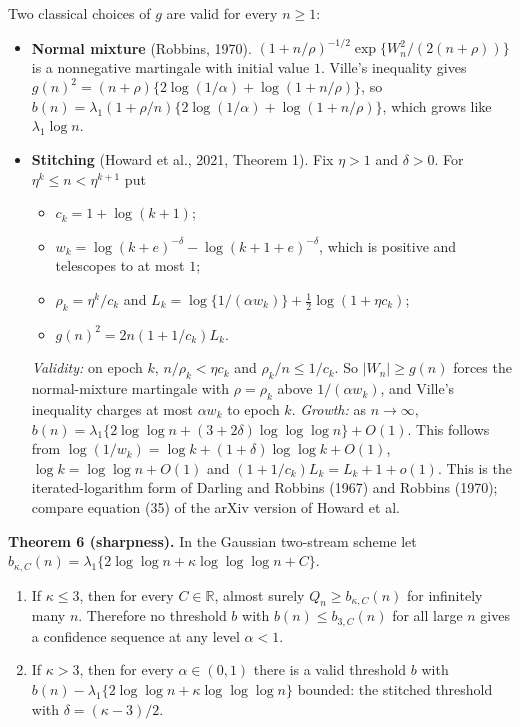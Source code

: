 \documentclass[
  10pt,
  a4paper,
]{article}
\providecommand{\tightlist}{%
  \setlength{\itemsep}{0pt}\setlength{\parskip}{0pt}}
\begin{document}
Two classical choices of \(g\) are valid for every \(n\ge1\):

\begin{itemize}
\tightlist
\item
  \textbf{Normal mixture} (Robbins, 1970).
  \((1+n/\rho)^{-1/2}\exp\{W_n^2/(2(n+\rho))\}\) is a nonnegative
  martingale with initial value \(1\). Ville's inequality gives
  \(g(n)^2=(n+\rho)\{2\log(1/\alpha)+\log(1+n/\rho)\}\), so
  \(b(n)=\lambda_1(1+\rho/n)\{2\log(1/\alpha)+\log(1+n/\rho)\}\), which
  grows like \(\lambda_1\log n\).
\item
  \textbf{Stitching} (Howard et al., 2021, Theorem 1). Fix \(\eta>1\)
  and \(\delta>0\). For \(\eta^k\le n<\eta^{k+1}\) put

  \begin{itemize}
  \tightlist
  \item
    \(c_k=1+\log(k+1)\);
  \item
    \(w_k=\log(k+e)^{-\delta}-\log(k+1+e)^{-\delta}\), which is positive
    and telescopes to at most \(1\);
  \item
    \(\rho_k=\eta^k/c_k\) and
    \(L_k=\log\{1/(\alpha w_k)\}+\tfrac12\log(1+\eta c_k)\);
  \item
    \(g(n)^2=2n(1+1/c_k)L_k\).
  \end{itemize}

  \emph{Validity:} on epoch \(k\), \(n/\rho_k<\eta c_k\) and
  \(\rho_k/n\le1/c_k\). So \(|W_n|\ge g(n)\) forces the normal-mixture
  martingale with \(\rho=\rho_k\) above \(1/(\alpha w_k)\), and Ville's
  inequality charges at most \(\alpha w_k\) to epoch \(k\).
  \emph{Growth:} as \(n\to\infty\),
  \(b(n)=\lambda_1\{2\log\log n+(3+2\delta)\log\log\log n\}+O(1)\). This
  follows from \(\log(1/w_k)=\log k+(1+\delta)\log\log k+O(1)\),
  \(\log k=\log\log n+O(1)\) and \((1+1/c_k)L_k=L_k+1+o(1)\). This is
  the iterated-logarithm form of Darling and Robbins (1967) and Robbins
  (1970); compare equation (35) of the arXiv version of Howard et al.
\end{itemize}

\textbf{Theorem 6 (sharpness).} In the Gaussian two-stream scheme let
\(b_{\kappa,C}(n)=\lambda_1\{2\log\log n+\kappa\log\log\log n+C\}\).

\begin{enumerate}
\def\labelenumi{(\roman{enumi})}
\item
  If \(\kappa\le3\), then for every \(C\in\mathbb R\), almost surely
  \(Q_n\ge b_{\kappa,C}(n)\) for infinitely many \(n\). Therefore no
  threshold \(b\) with \(b(n)\le b_{3,C}(n)\) for all large \(n\) gives
  a confidence sequence at any level \(\alpha<1\).
\item
  If \(\kappa>3\), then for every \(\alpha\in(0,1)\) there is a valid
  threshold \(b\) with
  \(b(n)-\lambda_1\{2\log\log n+\kappa\log\log\log n\}\) bounded: the
  stitched threshold with \(\delta=(\kappa-3)/2\).
\end{enumerate}
\end{document}
